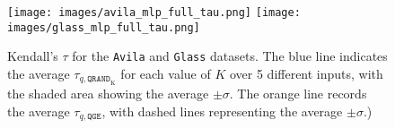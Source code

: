 \begin{figure}[htbp]
    \centering
    \texttt{[image: images/avila\_mlp\_full\_tau.png]}
    \texttt{[image: images/glass\_mlp\_full\_tau.png]}
    \caption{Kendall's $\tau$ for the \texttt{Avila} and \texttt{Glass} datasets. The blue line indicates the average $\tau_{q,\texttt{QRAND}_{\text{K}}}$ for each value of $K$ over 5 different inputs, with the shaded area showing the average 
 $\pm\sigma$. The orange line records the average $\tau_{q,\texttt{QGE}}$, with dashed lines representing the average $\pm\sigma$.)}
    \label{fig:exhaustive_correct_pairs}
\end{figure}






